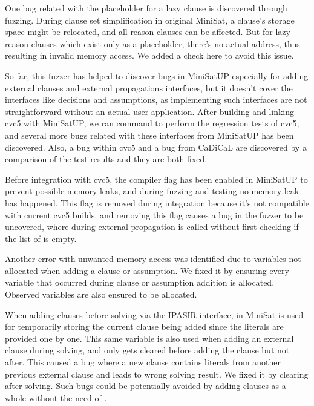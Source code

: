 One bug related with the placeholder for a lazy clause is discovered through fuzzing. During clause set simplification in original MiniSat, a clause's storage space might be relocated, and all reason clauses can be affected. But for lazy reason clauses which exist only as a placeholder, there's no actual address, thus resulting in invalid memory access. We added a check here to avoid this issue.

So far, this fuzzer has helped to discover bugs in MiniSatUP especially for adding external clauses and external propagations interfaces, but it doesn't cover the interfaces like decisions and assumptions, as implementing such interfaces are not straightforward without an actual user application. After building and linking cvc5 with MiniSatUP, we ran  command to perform the regression tests of cvc5, and several more bugs related with these interfaces from MiniSatUP has been discovered. Also, a bug within cvc5 and a bug from CaDiCaL are discovered by a comparison of the test results and they are both fixed.

Before integration with cvc5, the compiler flag  has been enabled in MiniSatUP to prevent possible memory leaks, and during fuzzing and testing no memory leak has happened. This flag is removed during integration because it's not compatible with current cvc5 builds, and removing this flag causes a bug in the fuzzer to be uncovered, where during external propagation  is called without first checking if the list of  is empty.

Another error with unwanted memory access was identified due to variables not allocated when adding a clause or assumption. We fixed it by ensuring every variable that occurred during clause or assumption addition is allocated. Observed variables are also ensured to be allocated.

When adding clauses before solving via the IPASIR interface,  in MiniSat is used for temporarily storing the current clause being added since the literals are provided one by one. This same variable is also used when adding an external clause during solving, and only gets cleared before adding the clause but not after. This caused a bug where a new clause contains literals from another previous external clause and leads to wrong solving result. We fixed it by clearing  after solving. Such bugs could be potentially avoided by adding clauses as a whole without the need of .

